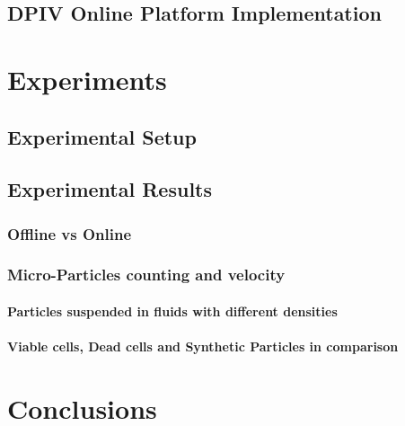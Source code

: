 \documentclass[journal]{IEEEtran}
\theoremstyle{definition}
\theoremstyle{remark}
\begin{document}

\subsection{DPIV Online Platform Implementation}\label{sec:method}

\section{Experiments}

\subsection{Experimental Setup}

\subsection{Experimental Results}

\subsubsection{Offline vs Online}

\subsubsection{Micro-Particles counting and velocity}

\paragraph{Particles suspended in fluids with different densities}

\paragraph{Viable cells, Dead cells and Synthetic Particles in comparison}

\section{Conclusions}


%
%
\end{document}
